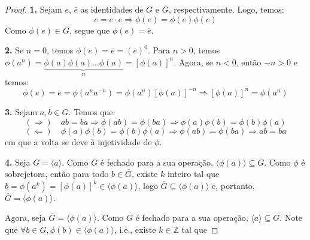 	\begin{proof}
		\textbf{1.} Sejam $e$, $\overline{e}$ as identidades de $G$ 
		e $\overline{G}$, respectivamente. Logo, temos:
		\begin{equation*}
		    e = e\cdot e \Rightarrow \phi (e) = \phi (e)\phi (e)
		\end{equation*} 
		Como $\phi (e)\in \overline{G}$, segue que 
		$\phi(e) = \overline{e}$. 
		\par\vspace{0.4cm}
		\textbf{2.} Se $n=0$, temos 
		$\phi (e) = \overline{e} = (\overline{e})^0$. 
		Para $n>0$, temos 
		$\phi(a^n)=\underbrace{\phi(a)\phi(a)\dots\phi(a)}_{n} 
		= [\phi(a)]^n$.
		Agora, se $n<0$, então $-n>0$ e temos:
		\begin{equation*}
		    \phi (e) = \overline{e} = \phi (a^n a^{-n}) 
		    = \phi (a^n)[\phi (a)]^{-n} \Rightarrow [\phi (a)]^n 
		    = \phi (a^n)
		\end{equation*}
		\par\vspace{0.4cm}
		\textbf{3.} Sejam $a,b \in G$. Temos que:
		\begin{equation*}
		(\Rightarrow) \hspace{12pt}ab = ba \Rightarrow \phi (ab) 
		= \phi (ba) \Rightarrow \phi (a)\phi (b) = \phi (b)\phi (a)
		\end{equation*}
		\begin{equation*}
		(\Leftarrow)\hspace{12pt}\phi(a)\phi(b) = \phi(b)\phi(a)
		\Rightarrow \phi(ab) = \phi(ba) \Rightarrow ab = ba
		\end{equation*}
		em que a volta se deve à injetividade de $\phi$.
		\par\vspace{0.4cm}
		\textbf{4.} Seja $G = \langle a \rangle $. Como $\overline{G}$ 
		é fechado para a sua operação, $\langle \phi(a)\rangle \subseteq \overline{G}$. 
		Como $\phi$ é sobrejetora, então para todo $b\in\overline{G}$,
		existe $k$ inteiro tal que 
		$b = \phi(a^k) = [\phi(a)]^k \in\langle \phi(a)\rangle $, 
		logo $\overline{G}\subseteq\langle \phi(a)\rangle$ e, portanto,
		$\overline{G} = \langle \phi(a)\rangle.$
		\par\vspace{0.3cm} Agora, seja 
		$\overline{G} = \langle \phi(a)\rangle$. Como $G$ é fechado para a sua operação,
		$\langle a\rangle \subseteq G$. Note que 
		$\forall b\in G, \phi(b)\in\langle \phi(a)\rangle$, i.e., 
		existe $k\in\mathbb{Z}$ tal que 

\end{proof}
